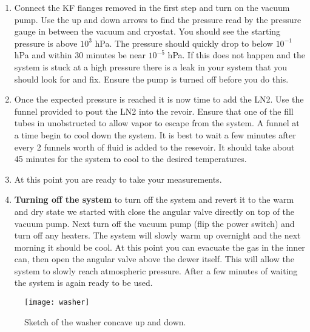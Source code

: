 \documentclass[m_cmp_sc_manual.tex]{subfiles}
\begin{document}
\begin{enumerate}
  \item Connect the KF flanges removed in the first step and turn on the vacuum
    pump. Use the up and down arrows to find the pressure read by the pressure
    gauge in between the vacuum and cryostat. You should see the starting
    pressure is above $10^3$ hPa. The pressure should quickly drop to below
    $10^{-1}$ hPa and within 30 minutes be near $10^{-5}$ hPa. If this does not
    happen and the system is stuck at a high pressure there is a leak in your
    system that you should look for and fix. Ensure the pump is turned off
    before you do this. 

  \item Once the expected pressure is reached it is now time to add the LN2. Use
    the funnel provided to pout the LN2 into the revoir. Ensure that one of the
    fill tubes in unobstructed to allow vapor to escape from the system. A
    funnel at a time begin to cool down the system. It is best to wait a few
    minutes after every 2 funnels worth of fluid is added to the resevoir. It
    should take about 45 minutes for the system to cool to the desired
    temperatures. 

  \item At this point you are ready to take your measurements.

  \item \textbf{Turning off the system} to turn off the system and revert it to
    the warm and dry state we started with close the angular valve directly
    on top of the vacuum pump. Next turn off the vacuum pump (flip the power
    switch) and turn off any heaters. The system will slowly warm up overnight
    and the next morning it should be cool. At this point you can evacuate the
    gas in the inner can, then open the angular valve above the dewer itself.
    This will allow the system to slowly reach atmospheric pressure. After a few
    minutes of waiting the system is again ready to be used. 
\end{enumerate}
\begin{figure}
  \texttt{[image: washer]}
  \caption{\label{fig:washer} Sketch of the washer concave up and down.}
\end{figure}
\end{document}
